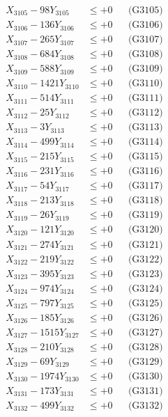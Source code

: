 \documentclass[a4paper,10pt]{article}
\begin{document}
{\begin{align}
X_{3105} - 98Y_{3105} &\leq +0 && \text{(G3105)} \\
X_{3106} - 136Y_{3106} &\leq +0 && \text{(G3106)} \\
X_{3107} - 265Y_{3107} &\leq +0 && \text{(G3107)} \\
X_{3108} - 684Y_{3108} &\leq +0 && \text{(G3108)} \\
X_{3109} - 588Y_{3109} &\leq +0 && \text{(G3109)} \\
X_{3110} - 1421Y_{3110} &\leq +0 && \text{(G3110)} \\
\allowbreak
X_{3111} - 514Y_{3111} &\leq +0 && \text{(G3111)} \\
X_{3112} - 25Y_{3112} &\leq +0 && \text{(G3112)} \\
X_{3113} - 3Y_{3113} &\leq +0 && \text{(G3113)} \\
X_{3114} - 499Y_{3114} &\leq +0 && \text{(G3114)} \\
X_{3115} - 215Y_{3115} &\leq +0 && \text{(G3115)} \\
X_{3116} - 231Y_{3116} &\leq +0 && \text{(G3116)} \\
X_{3117} - 54Y_{3117} &\leq +0 && \text{(G3117)} \\
X_{3118} - 213Y_{3118} &\leq +0 && \text{(G3118)} \\
X_{3119} - 26Y_{3119} &\leq +0 && \text{(G3119)} \\
X_{3120} - 121Y_{3120} &\leq +0 && \text{(G3120)} \\
\allowbreak
X_{3121} - 274Y_{3121} &\leq +0 && \text{(G3121)} \\
X_{3122} - 219Y_{3122} &\leq +0 && \text{(G3122)} \\
X_{3123} - 395Y_{3123} &\leq +0 && \text{(G3123)} \\
X_{3124} - 974Y_{3124} &\leq +0 && \text{(G3124)} \\
X_{3125} - 797Y_{3125} &\leq +0 && \text{(G3125)} \\
X_{3126} - 185Y_{3126} &\leq +0 && \text{(G3126)} \\
X_{3127} - 1515Y_{3127} &\leq +0 && \text{(G3127)} \\
X_{3128} - 210Y_{3128} &\leq +0 && \text{(G3128)} \\
X_{3129} - 69Y_{3129} &\leq +0 && \text{(G3129)} \\
X_{3130} - 1974Y_{3130} &\leq +0 && \text{(G3130)} \\
\allowbreak
X_{3131} - 173Y_{3131} &\leq +0 && \text{(G3131)} \\
X_{3132} - 499Y_{3132} &\leq +0 && \text{(G3132)} \\

\end{align}}
\end{document}
